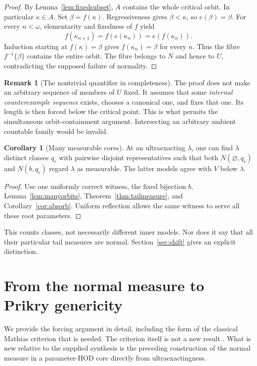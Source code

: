 \documentclass[11pt,letterpaper]{article}
\theoremstyle{definition}
\newtheorem{corollary}[definition]{Corollary}
\newtheorem{remark}[definition]{Remark}
\begin{document}
\begin{proof}
By Lemma~\ref{lem:fixedsubset}, $A$ contains the whole critical orbit. In particular $\kappa\in A$. Set $\beta=f(\kappa)$. Regressiveness gives $\beta<\kappa$, so $e(\beta)=\beta$. For every $n<\omega$, elementarity and fixedness of $f$ yield
\[
        f(\kappa_{n+1})=f(e(\kappa_n))=e(f(\kappa_n)).
\]
Induction starting at $f(\kappa)=\beta$ gives $f(\kappa_n)=\beta$ for every $n$. Thus the fibre $f^{-1}\{\beta\}$ contains the entire orbit. The fibre belongs to $N$ and hence to $U$, contradicting the supposed failure of normality.
\end{proof}

\begin{remark}[The nontrivial quantifier in completeness]
The proof does not make an arbitrary sequence of members of $U$ fixed. It assumes that some \emph{internal counterexample sequence} exists, chooses a canonical one, and fixes that one. Its length is then forced below the critical point. This is what permits the simultaneous orbit-containment argument. Intersecting an arbitrary ambient countable family would be invalid.
\end{remark}

\begin{corollary}[Many measurable cores]\label{cor:manymeasurable}
At an ultraexacting $\lambda$, one can find $\lambda$ distinct classes $q_r$ with pairwise disjoint representatives such that both $N(\varnothing,q_r)$ and $N(b,q_r)$ regard $\lambda$ as measurable. The latter models agree with $V$ below $\lambda$.
\end{corollary}

\begin{proof}
Use one uniformly correct witness, the fixed bijection $b$, Lemma~\ref{lem:manyorbits}, Theorem~\ref{thm:tailmeasure}, and Corollary~\ref{cor:absorb}. Uniform reflection allows the same witness to serve all these root parameters.
\end{proof}

This counts classes, not necessarily different inner models. Nor does it say that all their particular tail measures are normal. Section~\ref{sec:shift} gives an explicit distinction.

\section{From the normal measure to Prikry genericity}\label{sec:prikry}

We provide the forcing argument in detail, including the form of the classical Mathias criterion that is needed. The criterion itself is not a new result \cite{mathias}. What is new relative to the supplied synthesis is the preceding construction of the normal measure in a parameter-HOD core directly from ultraexactingness.
\end{document}
